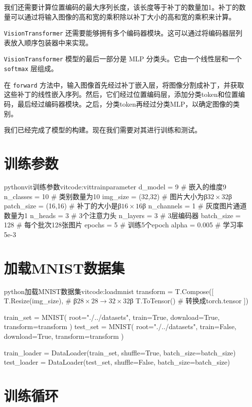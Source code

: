 \documentclass[lang=cn,newtx,10pt,scheme=chinese]{elegantbook}
\newcommand{\py}[1]{%
  \colorbox{gray!10}{\texttt{#1}}%
}
\begin{document}
我们还需要计算位置编码的最大序列长度，该长度等于补丁的数量加1。补丁的数量可以通过将输入图像的高和宽的乘积除以补丁大小的高和宽的乘积来计算。

\py{VisionTransformer} 还需要能够拥有多个编码器模块。这可以通过将编码器层列表放入顺序包装器中来实现。

\py{VisionTransformer} 模型的最后一部分是 MLP 分类头。它由一个线性层和一个 \py{softmax} 层组成。

在 \py{forward} 方法中，输入图像首先经过补丁嵌入层，将图像分割成补丁，并获取这些补丁的线性嵌入序列。然后，它们经过位置编码层，添加分类token和位置编码，最后经过编码器模块。之后，分类token再经过分类MLP，以确定图像的类别。

我们已经完成了模型的构建。现在我们需要对其进行训练和测试。

\section{训练参数}

\begin{codebox}{python}{vit训练参数}{vitcode:vittrainparameter}
d_model = 9 # 嵌入的维度9
n_classes = 10 # 类别数量为10
img_size = (32,32) # 图片大小为β$32\times 32$β
patch_size = (16,16) # 补丁的大小是β$16\times 16$β
n_channels = 1 # 灰度图片通道数量为1
n_heads = 3 # 3个注意力头
n_layers = 3 # 3层编码器
batch_size = 128 # 每个批次128张图片
epochs = 5 # 训练5个epoch
alpha = 0.005 # 学习率5e-3
\end{codebox}

\section{加载MNIST数据集}

\begin{codebox}{python}{加载MNIST数据集}{vitcode:loadmnist}
transform = T.Compose([
    T.Resize(img_size), # β$28\times 28 \rightarrow 32\times 32$β
    T.ToTensor() # 转换成torch.tensor
])

train_set = MNIST(
    root="./../datasets", train=True, download=True, transform=transform
)
test_set = MNIST(
    root="./../datasets", train=False, download=True, transform=transform
)

train_loader = DataLoader(train_set, shuffle=True, batch_size=batch_size)
test_loader = DataLoader(test_set, shuffle=False, batch_size=batch_size)
\end{codebox}

\section{训练循环}
\end{document}
